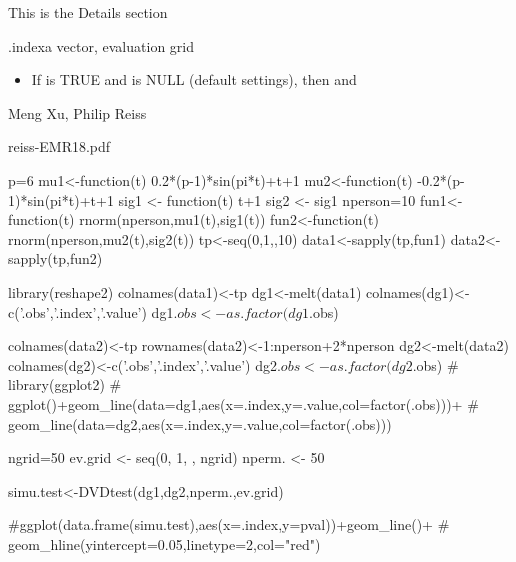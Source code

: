 \documentclass[a4paper]{book}
\begin{document}
%
\begin{Details}\relax
This is the Details section
\end{Details}
%
\begin{Value}
.indexa vector, evaluation grid 
\end{Value}
%
\begin{Note}\relax
\begin{itemize}

\item If  is TRUE and  is NULL (default settings), 
then  and 

\end{itemize}

\end{Note}
%
\begin{Author}\relax
Meng Xu, Philip Reiss
\end{Author}
%
\begin{References}\relax
reiss-EMR18.pdf
\end{References}
%
\begin{Examples}
\begin{ExampleCode}

 p=6
 mu1<-function(t) 0.2*(p-1)*sin(pi*t)+t+1
 mu2<-function(t) -0.2*(p-1)*sin(pi*t)+t+1
 sig1 <- function(t) t+1
 sig2 <- sig1
 nperson=10
 fun1<-function(t) rnorm(nperson,mu1(t),sig1(t))
 fun2<-function(t) rnorm(nperson,mu2(t),sig2(t))
 tp<-seq(0,1,,10)
 data1<-sapply(tp,fun1)
 data2<-sapply(tp,fun2)
 
 library(reshape2)
 colnames(data1)<-tp
 dg1<-melt(data1)
 colnames(dg1)<-c('.obs','.index','.value')
 dg1$.obs<-as.factor(dg1$.obs)
 
 colnames(data2)<-tp
 rownames(data2)<-1:nperson+2*nperson
 dg2<-melt(data2)
 colnames(dg2)<-c('.obs','.index','.value')
 dg2$.obs<-as.factor(dg2$.obs)
 # library(ggplot2)
 # ggplot()+geom_line(data=dg1,aes(x=.index,y=.value,col=factor(.obs)))+
 #   geom_line(data=dg2,aes(x=.index,y=.value,col=factor(.obs)))

 ngrid=50
 ev.grid <- seq(0, 1, , ngrid)
 nperm. <- 50
 
 simu.test<-DVDtest(dg1,dg2,nperm.,ev.grid)
 
 #ggplot(data.frame(simu.test),aes(x=.index,y=pval))+geom_line()+
 # geom_hline(yintercept=0.05,linetype=2,col="red")
\end{ExampleCode}
\end{Examples}
\end{document}
